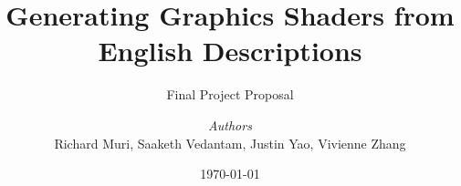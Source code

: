 \documentclass[a4paper, 12pt]{report}
\institute{Massachusetts Institute of Technology}
\title{Generating Graphics Shaders from English Descriptions}
\subtitle{Final Project Proposal}
\author{\textit{Authors}\\Richard Muri, Saaketh Vedantam, Justin Yao, Vivienne Zhang}
\date{\today}
\begin{document}
\maketitle
\romantableofcontents




\printbibliography
\end{document}
